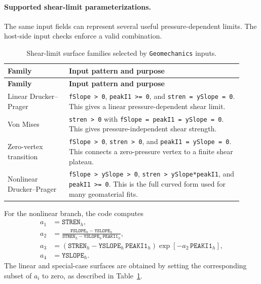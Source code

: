 \paragraph{Supported shear-limit parameterizations.}
The same input fields can represent several useful pressure-dependent limits.  The host-side input checks enforce a valid combination.
\begin{longtable}{@{}p{0.24\linewidth}p{0.68\linewidth}@{}}
\caption{Shear-limit surface families selected by \texttt{Geomechanics} inputs.\label{tab:geomechanics-surface-families}}\\
\toprule
\textbf{Family} & \textbf{Input pattern and purpose}\\
\midrule
\endfirsthead
\toprule
\textbf{Family} & \textbf{Input pattern and purpose}\\
\midrule
\endhead
Linear Drucker--Prager & \texttt{fSlope > 0}, \texttt{peakI1 >= 0}, and \texttt{stren = ySlope = 0}.  This gives a linear pressure-dependent shear limit.\\
Von Mises & \texttt{stren > 0} with \texttt{fSlope = peakI1 = ySlope = 0}.  This gives pressure-independent shear strength.\\
Zero-vertex transition & \texttt{fSlope > 0}, \texttt{stren > 0}, and \texttt{peakI1 = ySlope = 0}.  This connects a zero-pressure vertex to a finite shear plateau.\\
Nonlinear Drucker--Prager & \texttt{fSlope > ySlope > 0}, \texttt{stren > ySlope*peakI1}, and \texttt{peakI1 >= 0}.  This is the full curved form used for many geomaterial fits.\\
\bottomrule
\end{longtable}

For the nonlinear branch, the code computes
\begin{align}
  a_1 &= \texttt{STREN}_h, \\
  a_2 &= \frac{\texttt{FSLOPE}_h-\texttt{YSLOPE}_h}{\texttt{STREN}_h-\texttt{YSLOPE}_h\,\texttt{PEAKI1}_h},\\
  a_3 &= \left(\texttt{STREN}_h-\texttt{YSLOPE}_h\,\texttt{PEAKI1}_h\right)
         \exp\left[-a_2\,\texttt{PEAKI1}_h\right],\\
  a_4 &= \texttt{YSLOPE}_h.
  \label{eq:geomechanics-limit-parameters}
\end{align}
The linear and special-case surfaces are obtained by setting the corresponding subset of \(a_i\) to zero, as described in Table~\ref{tab:geomechanics-surface-families}.

